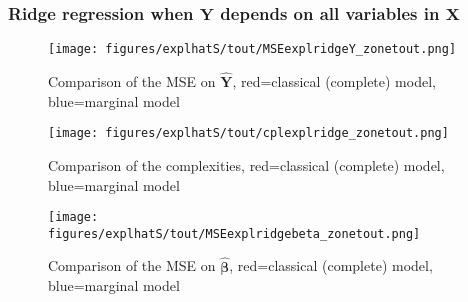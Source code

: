 \documentclass[12pt,a4paper]{report}
\begin{document}
\subsubsection{Ridge regression when $\boldsymbol{Y}$ depends on all variables in $\boldsymbol{X}$}

\begin{figure}[h!]
	\centering
		  \texttt{[image: figures/explhatS/tout/MSEexplridgeY\_zonetout.png]}
		\caption{Comparison of the MSE on $\hat{\boldsymbol{Y}}$, red=classical (complete) model, blue=marginal model}\label{MSEexplridgeY_zonetout}
	\end{figure}
	\begin{figure}[h!]
	\centering
		  \texttt{[image: figures/explhatS/tout/cplexplridge\_zonetout.png]}
		\caption{Comparison of the complexities, red=classical (complete) model, blue=marginal model}\label{cplexplridge_zonetout}
	\end{figure}
	\begin{figure}[h!]
	\centering
		  \texttt{[image: figures/explhatS/tout/MSEexplridgebeta\_zonetout.png]}
		\caption{Comparison of the MSE on $\hat{\boldsymbol{\beta}}$, red=classical (complete) model, blue=marginal model}\label{MSEexplridgebeta_zonetout}
	\end{figure}
	\FloatBarrier
 
 
 
\end{document}
